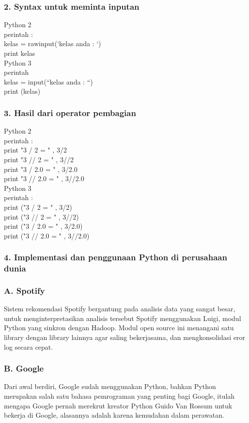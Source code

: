 \documentclass[12pt, times new roman, a4paper]{article}
\begin{document}
\subsubsection*{2. Syntax untuk meminta inputan}
Python 2\\
perintah :\\
kelas = raw\textunderscore input(‘kelas anda : ‘)\\
print kelas\\
Python 3\\
perintah\\
kelas = input(“kelas anda : “)\\
print (kelas)

\subsubsection*{3. Hasil dari operator pembagian}
Python 2\\
perintah :\\
print "3 / 2 = " , 3/2\\
print "3 // 2 = " , 3//2\\
print "3 / 2.0 = " , 3/2.0\\
print "3 // 2.0 = " , 3//2.0\\
Python 3\\
perintah :\\
print ("3 / 2 = " , 3/2)\\
print ("3 // 2 = " , 3//2)\\
print ("3 / 2.0 = " , 3/2.0)\\
print ("3 // 2.0 = " , 3//2.0)\\

\subsubsection*{4. Implementasi dan penggunaan Python di perusahaan dunia}

\subsubsection*{A. Spotify}
Sistem rekomendasi Spotify bergantung pada analisis data yang sangat besar, untuk menginterpretasikan analisis tersebut Spotify menggunakan Luigi, modul Python yang sinkron dengan Hadoop. Modul open source ini menangani satu library dengan library lainnya agar saling bekerjasama, dan mengkonsolidasi eror log secara cepat.

\subsubsection*{B. Google}
Dari awal berdiri, Google sudah menggunakan Python, bahkan Python merupakan salah satu bahasa pemrograman yang penting bagi Google, itulah mengapa Google pernah merekrut kreator Python Guido Van Rossum untuk bekerja di Google, alasannya adalah karena kemudahan dalam perawatan.
\end{document}
